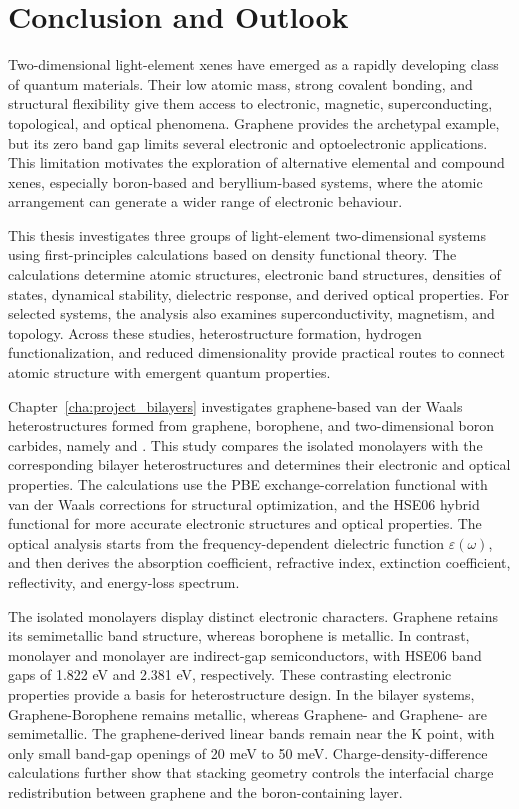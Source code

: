 \chapter{Conclusion and Outlook}
\label{cha:conclusion_outlook}

Two-dimensional light-element xenes have emerged as a rapidly developing class of quantum materials.
Their low atomic mass, strong covalent bonding, and structural flexibility give them access to electronic, magnetic, superconducting, topological, and optical phenomena.
Graphene provides the archetypal example, but its zero band gap limits several electronic and optoelectronic applications.
This limitation motivates the exploration of alternative elemental and compound xenes, especially boron-based and beryllium-based systems, where the atomic arrangement can generate a wider range of electronic behaviour.

This thesis investigates three groups of light-element two-dimensional systems using first-principles calculations based on density functional theory.
The calculations determine atomic structures, electronic band structures, densities of states, dynamical stability, dielectric response, and derived optical properties.
For selected systems, the analysis also examines superconductivity, magnetism, and topology.
Across these studies, heterostructure formation, hydrogen functionalization, and reduced dimensionality provide practical routes to connect atomic structure with emergent quantum properties.

Chapter~\ref{cha:project_bilayers} investigates graphene-based van der Waals heterostructures formed from graphene, borophene, and two-dimensional boron carbides, namely  and .
This study compares the isolated monolayers with the corresponding bilayer heterostructures and determines their electronic and optical properties.
The calculations use the PBE exchange-correlation functional with van der Waals corrections for structural optimization, and the HSE06 hybrid functional for more accurate electronic structures and optical properties.
The optical analysis starts from the frequency-dependent dielectric function $\varepsilon(\omega)$, and then derives the absorption coefficient, refractive index, extinction coefficient, reflectivity, and energy-loss spectrum.

The isolated monolayers display distinct electronic characters.
Graphene retains its semimetallic band structure, whereas borophene is metallic.
In contrast, monolayer  and monolayer  are indirect-gap semiconductors, with HSE06 band gaps of 1.822 eV and 2.381 eV, respectively.
These contrasting electronic properties provide a basis for heterostructure design.
In the bilayer systems, Graphene-Borophene remains metallic, whereas Graphene- and Graphene- are semimetallic.
The graphene-derived linear bands remain near the $\mathrm{K}$ point, with only small band-gap openings of 20 meV to 50 meV.
Charge-density-difference calculations further show that stacking geometry controls the interfacial charge redistribution between graphene and the boron-containing layer.

